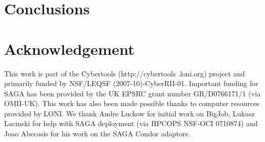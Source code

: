 \documentclass[conference,final]{IEEEtran}
\begin{document}
\section{Conclusions}


\section*{Acknowledgement}
This work is part of the Cybertools (http://cybertools .loni.org) project and primarily 
funded by NSF/LEQSF (2007-10)-CyberRII-01. Important funding for SAGA has been provided 
by the UK EPSRC grant number GR/D0766171/1 (via OMII-UK). This work has also been made 
possible thanks to computer resources provided by LONI. We thank Andre Luckow for 
initial work on BigJob, Lukasz Lacinski for help with SAGA deployment (via HPCOPS NSF-OCI 
0710874) and Joao Abecasis for his work on the SAGA Condor adaptors.

\nocite{ex1,ex2}
%


\end{document}
